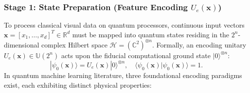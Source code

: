 \documentclass[pdflatex,sn-mathphys-num]{sn-jnl}%
\theoremstyle{thmstyleone}%
\theoremstyle{thmstyletwo}%
\theoremstyle{thmstylethree}%
\begin{document}
\subsubsection{Stage 1: State Preparation (Feature Encoding $U_e(\mathbf{x})$)}
To process classical visual data on quantum processors, continuous input vectors $\mathbf{x} = [x_1, \dots, x_d]^T \in \mathbb{R}^d$ must be mapped into quantum states residing in the $2^n$-dimensional complex Hilbert space $\mathcal{H} = (\mathbb{C}^2)^{\otimes n}$. Formally, an encoding unitary $U_e(\mathbf{x}) \in \mathbb{U}(2^n)$ acts upon the fiducial computational ground state $|0\rangle^{\otimes n}$:
\begin{equation}
|\psi_0(\mathbf{x})\rangle = U_e(\mathbf{x}) |0\rangle^{\otimes n}, \quad \langle \psi_0(\mathbf{x}) | \psi_0(\mathbf{x}) \rangle = 1.
\label{eq:state_prep_general}
\end{equation}
In quantum machine learning literature, three foundational encoding paradigms exist, each exhibiting distinct physical properties:
\end{document}
